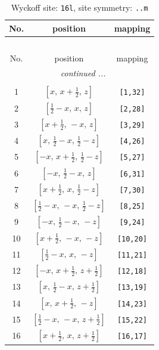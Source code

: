 \documentclass[fleqn,8pt]{jsarticle}
\begin{document}
\renewcommand{\arraystretch}{1.2}
\begin{longtable}{ccc}
\caption{Wyckoff site: {\tt 16l}, site symmetry: {\tt ..m}}
 \\
 \hline \hline
No. & position & mapping \\ \hline \endfirsthead

\multicolumn{2}{l}{\tablename\ \thetable{}} \\
 \hline \hline
No. & position & mapping \\ \hline \endhead

 \hline \hline
\multicolumn{2}{r}{\footnotesize\it continued ...} \\ \endfoot

 \hline \hline
\multicolumn{2}{r}{} \\ \endlastfoot

1 & $\left[ x,\, x + \frac{1}{2},\, z \right]$ & {\tt [1,32]} \\ \hline
2 & $\left[ \frac{1}{2} - x,\, x,\, z \right]$ & {\tt [2,28]} \\ \hline
3 & $\left[ x + \frac{1}{2},\, - x,\, z \right]$ & {\tt [3,29]} \\ \hline
4 & $\left[ x,\, \frac{1}{2} - x,\, \frac{1}{2} - z \right]$ & {\tt [4,26]} \\ \hline
5 & $\left[ - x,\, x + \frac{1}{2},\, \frac{1}{2} - z \right]$ & {\tt [5,27]} \\ \hline
6 & $\left[ - x,\, \frac{1}{2} - x,\, z \right]$ & {\tt [6,31]} \\ \hline
7 & $\left[ x + \frac{1}{2},\, x,\, \frac{1}{2} - z \right]$ & {\tt [7,30]} \\ \hline
8 & $\left[ \frac{1}{2} - x,\, - x,\, \frac{1}{2} - z \right]$ & {\tt [8,25]} \\ \hline
9 & $\left[ - x,\, \frac{1}{2} - x,\, - z \right]$ & {\tt [9,24]} \\ \hline
10 & $\left[ x + \frac{1}{2},\, - x,\, - z \right]$ & {\tt [10,20]} \\ \hline
11 & $\left[ \frac{1}{2} - x,\, x,\, - z \right]$ & {\tt [11,21]} \\ \hline
12 & $\left[ - x,\, x + \frac{1}{2},\, z + \frac{1}{2} \right]$ & {\tt [12,18]} \\ \hline
13 & $\left[ x,\, \frac{1}{2} - x,\, z + \frac{1}{2} \right]$ & {\tt [13,19]} \\ \hline
14 & $\left[ x,\, x + \frac{1}{2},\, - z \right]$ & {\tt [14,23]} \\ \hline
15 & $\left[ \frac{1}{2} - x,\, - x,\, z + \frac{1}{2} \right]$ & {\tt [15,22]} \\ \hline
16 & $\left[ x + \frac{1}{2},\, x,\, z + \frac{1}{2} \right]$ & {\tt [16,17]} \\
\end{longtable}
\end{document}
